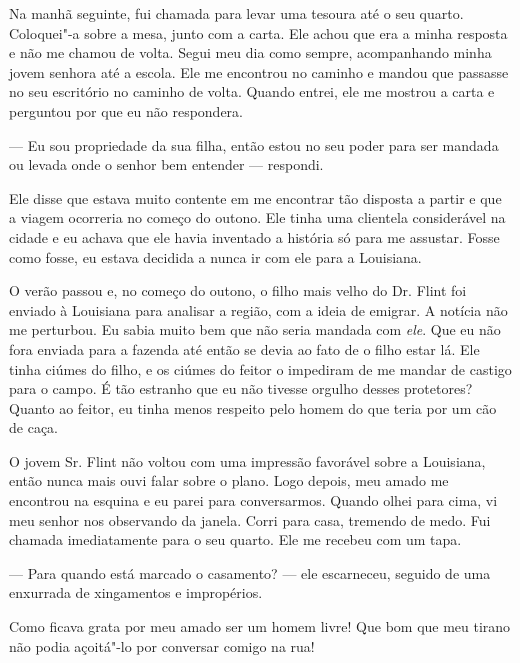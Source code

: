 Na manhã seguinte, fui chamada para
levar uma tesoura até o seu quarto. Coloquei"-a sobre a mesa, junto com a
carta. Ele achou que era a minha resposta e não me chamou de volta.
Segui meu dia como sempre, acompanhando minha jovem senhora até a
escola. Ele me encontrou no caminho e mandou que passasse no seu
escritório no caminho de volta. Quando entrei, ele me mostrou a carta e
perguntou por que eu não respondera.

--- Eu sou propriedade da sua filha, então estou no seu poder para ser
mandada ou levada onde o senhor bem entender --- respondi.

Ele disse que estava muito contente em me encontrar tão disposta a
partir e que a viagem ocorreria no começo do outono. Ele tinha uma
clientela considerável na cidade e eu achava que ele havia inventado a
história só para me assustar. Fosse como fosse, eu estava decidida a
nunca ir com ele para a Louisiana.

O verão passou e, no começo do outono,
o filho mais velho do Dr. Flint foi enviado à Louisiana para analisar a
região, com a ideia de emigrar. A notícia não me perturbou. Eu sabia
muito bem que não seria mandada com \emph{ele}. Que eu não fora enviada
para a fazenda até então se devia ao fato de o filho estar lá. Ele tinha
ciúmes do filho, e os ciúmes do feitor o impediram de me mandar de
castigo para o campo. É tão estranho que eu não tivesse orgulho desses
protetores? Quanto ao feitor, eu tinha menos respeito pelo homem do que
teria por um cão de caça.

O jovem Sr. Flint não voltou com uma
impressão favorável sobre a Louisiana, então nunca mais ouvi falar sobre
o plano. Logo depois, meu amado me encontrou na esquina e eu parei para
conversarmos. Quando olhei para cima, vi meu senhor nos observando da
janela. Corri para casa, tremendo de medo. Fui chamada imediatamente
para o seu quarto. Ele me recebeu com um tapa.

--- Para quando está marcado o casamento? --- ele escarneceu, seguido de
uma enxurrada de xingamentos e impropérios.

Como ficava grata por meu amado ser um homem livre! Que bom que meu
tirano não podia açoitá"-lo por conversar comigo na rua!

